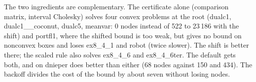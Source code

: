 \documentclass[11pt]{article}
\begin{document}
\begin{table}[h]
\centering
{}
\caption{Variants of the bound. Time ratios, W/L and nodes on the 223 instances solved
by all (71 that take more than 1~s).}
\label{tab:variants}
\end{table}

The two ingredients are complementary. The certificate alone (comparison matrix,
interval Cholesky) solves four convex problems at the root (dualc1,
dualc1\_\_coconut, dualc5, meanvar: 0 nodes instead of 522 to 23\,186 with the shift)
and portfl1, where the shifted bound is too weak, but gives no bound on nonconvex
boxes and loses ex8\_4\_1 and robot (twice slower). The shift is better there; the
scaled rule also solves ex8\_4\_6 and ex8\_4\_6ter. The default gets both, and on
dnieper does better than either (68 nodes against 150 and 434). The backoff divides
the cost of the bound by about seven without losing nodes.
\end{document}

